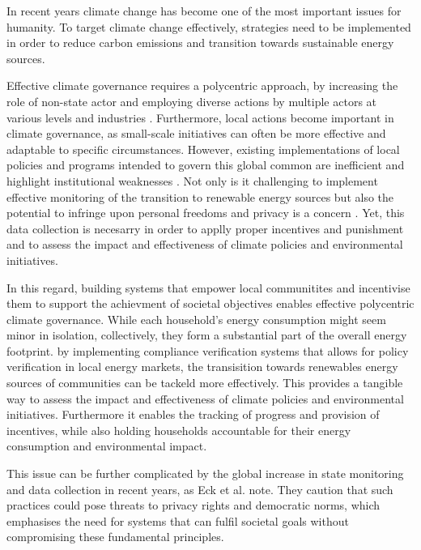 

In recent years climate change has become one of the most important issues for humanity. 
To target climate change effectively, strategies need to be implemented in order to reduce carbon emissions and transition towards sustainable energy sources. 

Effective climate governance requires a polycentric approach, by increasing the role of non-state actor and employing diverse actions by multiple actors at various levels and industries \cite{Huitema2010GoverningCC}. Furthermore, local actions become important in climate governance, as small-scale initiatives can often be more effective and adaptable to specific circumstances. 
However, existing implementations of local policies and programs intended to govern  this global common are inefficient and highlight institutional weaknesses \cite{brazilCommons}. Not only is it challenging to implement effective monitoring of the transition to renewable energy sources but also the potential to infringe upon personal freedoms and privacy is a concern \cite{molina2010private}. Yet, this data collection is necesarry in order to applly proper incentives and punishment and  to assess the impact and effectiveness of climate policies and environmental initiatives.  

In this regard, building systems that empower local communitites and incentivise them to support the achievment of societal objectives enables effective polycentric climate governance. While each household’s energy consumption might seem minor in isolation, collectively, they form a substantial part of the overall energy footprint. by implementing compliance verification systems that allows for policy verification in local energy markets, the transisition towards renewables energy sources of communities can be tackeld more effectively.  This provides a tangible way to assess the impact and effectiveness of climate policies and environmental initiatives. Furthermore it enables the tracking of progress and provision of incentives, while also holding households accountable for their energy consumption and environmental impact.

This issue can be further complicated by the global increase in state monitoring and data collection in recent years, as Eck et al. \cite{surveill} note. They caution that such practices could pose threats to privacy rights and democratic norms, which emphasises the need for systems that can fulfil societal goals without compromising these fundamental principles.


